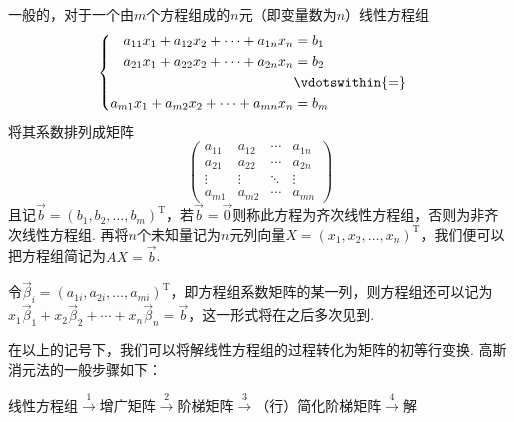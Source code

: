一般的，对于一个由$m$个方程组成的$n$元（即变量数为$n$）线性方程组
\[ \begin{cases} \begin{aligned}
            a_{11}x_1+a_{12}x_2+\cdots+a_{1n}x_n & = b_1           \\
            a_{21}x_1+a_{22}x_2+\cdots+a_{2n}x_n & = b_2           \\
                                                 & \vdotswithin{=} \\
            a_{m1}x_1+a_{m2}x_2+\cdots+a_{mn}x_n & = b_m
        \end{aligned} \end{cases} \]
将其系数排列成矩阵
\[\begin{pmatrix}
        a_{11} & a_{12} & \cdots & a_{1n} \\
        a_{21} & a_{22} & \cdots & a_{2n} \\
        \vdots & \vdots & \ddots & \vdots \\
        a_{m1} & a_{m2} & \cdots & a_{mn}
    \end{pmatrix}\]
且记$\vec{b}=(b_1,b_2,\ldots,b_m)^\mathrm{T}$，若$\vec{b}=\vec{0}$则称此方程为齐次线性方程组，否则为非齐次线性方程组. 再将$n$个未知量记为$n$元列向量$X=(x_1,x_2,\ldots,x_n)^\mathrm{T}$，我们便可以把方程组简记为$AX=\vec{b}$.

令$\vec{\beta}_i=(a_{1i},a_{2i},\ldots,a_{mi})^\mathrm{T}$，即方程组系数矩阵的某一列，则方程组还可以记为$x_1\vec{\beta}_1+x_2\vec{\beta}_2+\cdots+x_n\vec{\beta}_n=\vec{b}$，这一形式将在之后多次见到.

在以上的记号下，我们可以将解线性方程组的过程转化为矩阵的初等行变换. 高斯消元法的一般步骤如下：
\begin{center}
    线性方程组$\overset{1}{\longrightarrow}$增广矩阵$\overset{2}{\longrightarrow}$阶梯矩阵$\overset{3}{\longrightarrow}$（行）简化阶梯矩阵$\overset{4}{\longrightarrow}$解
\end{center}

